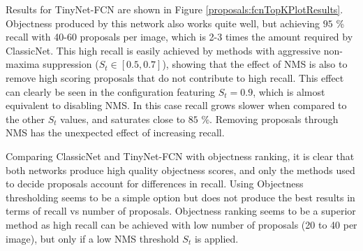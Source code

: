Results for TinyNet-FCN are shown in Figure \ref{proposals:fcnTopKPlotResults}. Objectness produced by this network also works quite well, but achieving $95$ \% recall with 40-60 proposals per image, which is 2-3 times the amount required by ClassicNet. This high recall is easily achieved by methods with aggressive non-maxima suppression ($S_t \in [0.5, 0.7]$), showing that the effect of NMS is also to remove high scoring proposals that do not contribute to high recall.
This effect can clearly be seen in the configuration featuring $S_t = 0.9$, which is almost equivalent to disabling NMS. In this case recall grows slower when compared to the other $S_t$ values, and saturates close to $85$ \%. Removing proposals through NMS has the unexpected effect of increasing recall.

Comparing ClassicNet and TinyNet-FCN with objectness ranking, it is clear that both networks produce high quality objectness scores, and only the methods used to decide proposals account for differences in recall. Using Objectness thresholding seems to be a simple option but does not produce the best results in terms of recall vs number of proposals. Objectness ranking seems to be a superior method as high recall can be achieved with low number of proposals (20 to 40 per image), but only if a low NMS threshold $S_t$ is applied.


